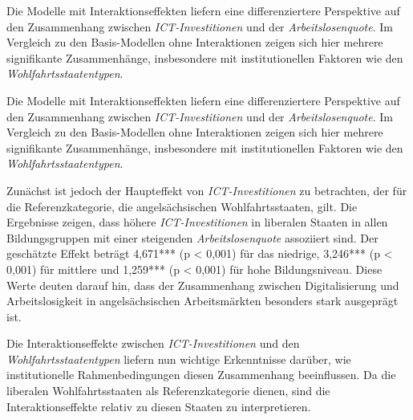 

Die Modelle mit Interaktionseffekten liefern eine differenziertere Perspektive auf den 
Zusammenhang zwischen \textit{\ac{ICT}-Investitionen} und der \textit{Arbeitslosenquote}. 
Im Vergleich zu den Basis-Modellen ohne Interaktionen zeigen sich hier mehrere 
signifikante Zusammenhänge, insbesondere mit institutionellen Faktoren wie den 
\textit{Wohlfahrtsstaatentypen}.

Die Modelle mit Interaktionseffekten liefern eine differenziertere Perspektive auf den 
Zusammenhang zwischen \textit{\ac{ICT}-Investitionen} und der \textit{Arbeitslosenquote}. 
Im Vergleich zu den Basis-Modellen ohne Interaktionen zeigen sich hier mehrere 
signifikante Zusammenhänge, insbesondere mit institutionellen Faktoren wie den 
\textit{Wohlfahrtsstaatentypen}. 

Zunächst ist jedoch der Haupteffekt von \textit{\ac{ICT}-Investitionen} zu betrachten, 
der für die Referenzkategorie, die angelsächsischen Wohlfahrtsstaaten, gilt. Die 
Ergebnisse zeigen, dass höhere \textit{\ac{ICT}-Investitionen} in liberalen Staaten in 
allen Bildungsgruppen mit einer steigenden \textit{Arbeitslosenquote} assoziiert sind. 
Der geschätzte Effekt beträgt 4,671*** (p < 0,001) für das niedrige, 3,246*** 
(p < 0,001) für mittlere und 1,259*** (p < 0,001) für hohe Bildungsniveau. Diese Werte 
deuten darauf hin, dass der Zusammenhang zwischen Digitalisierung und Arbeitslosigkeit 
in angelsächsischen Arbeitsmärkten besonders stark ausgeprägt ist. 


Die Interaktionseffekte zwischen \textit{\ac{ICT}-Investitionen} und den 
\textit{Wohlfahrtsstaatentypen} liefern nun wichtige Erkenntnisse darüber, wie 
institutionelle Rahmenbedingungen diesen Zusammenhang beeinflussen. Da die liberalen 
Wohlfahrtsstaaten als Referenzkategorie dienen, sind die Interaktionseffekte relativ 
zu diesen Staaten zu interpretieren.

